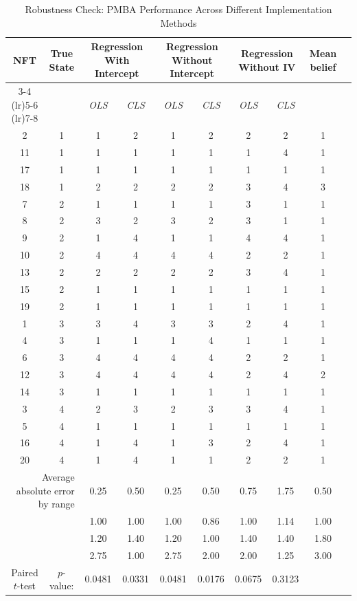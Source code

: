 \documentclass[12pt,reqno]{amsart}
\begin{document}
\begin{table}[htbp]
\footnotesize
\centering
\tiny
\begin{threeparttable}
\caption{Robustness Check: PMBA Performance Across Different Implementation Methods}\label{tab:rob1}
\setlength{\tabcolsep}{4pt}\begin{tabular}{cccccccccc}
\toprule
\textbf{NFT} & \textbf{True State} & \multicolumn{2}{c}{Regression With Intercept} & \multicolumn{2}{c}{Regression Without Intercept} & \multicolumn{2}{c}{Regression Without IV} & Mean belief \\
\cmidrule(lr){3-4} \cmidrule(lr){5-6} \cmidrule(lr){7-8}
& & \textit{OLS} & \textit{CLS} & \textit{OLS} & \textit{CLS} & \textit{OLS} & \textit{CLS} & \\
\midrule
2  & 1 & 1 & 2 & 1 & 2 & 2 & 2 & 1 \\
11 & 1 & 1 & 1 & 1 & 1 & 1 & 4 & 1 \\
17 & 1 & 1 & 1 & 1 & 1 & 1 & 1 & 1 \\
18 & 1 & 2 & 2 & 2 & 2 & 3 & 4 & 3 \\
7  & 2 & 1 & 1 & 1 & 1 & 3 & 1 & 1 \\
8  & 2 & 3 & 2 & 3 & 2 & 3 & 1 & 1 \\
9  & 2 & 1 & 4 & 1 & 1 & 4 & 4 & 1 \\
10 & 2 & 4 & 4 & 4 & 4 & 2 & 2 & 1 \\
13 & 2 & 2 & 2 & 2 & 2 & 3 & 4 & 1 \\
15 & 2 & 1 & 1 & 1 & 1 & 1 & 1 & 1 \\
19 & 2 & 1 & 1 & 1 & 1 & 1 & 1 & 1 \\
1  & 3 & 3 & 4 & 3 & 3 & 2 & 4 & 1 \\
4  & 3 & 1 & 1 & 1 & 4 & 1 & 1 & 1 \\
6  & 3 & 4 & 4 & 4 & 4 & 2 & 2 & 1 \\
12 & 3 & 4 & 4 & 4 & 4 & 2 & 4 & 2 \\
14 & 3 & 1 & 1 & 1 & 1 & 1 & 1 & 1 \\
3  & 4 & 2 & 3 & 2 & 3 & 3 & 4 & 1 \\
5  & 4 & 1 & 1 & 1 & 1 & 1 & 1 & 1 \\
16 & 4 & 1 & 4 & 1 & 3 & 2 & 4 & 1 \\
20 & 4 & 1 & 4 & 1 & 1 & 2 & 2 & 1 \\
\midrule
\multicolumn{2}{r}{Average absolute error by range} & 0.25 & 0.50 & 0.25 & 0.50 & 0.75 & 1.75 & 0.50 \\
& & 1.00 & 1.00 & 1.00 & 0.86 & 1.00 & 1.14 & 1.00 \\
& & 1.20 & 1.40 & 1.20 & 1.00 & 1.40 & 1.40 & 1.80 \\
& & 2.75 & 1.00 & 2.75 & 2.00 & 2.00 & 1.25 & 3.00 \\
\midrule
Paired $t$-test & $p$-value:  & 0.0481 & 0.0331 & 0.0481 & 0.0176 & 0.0675 & 0.3123 & \\
\bottomrule
\end{tabular}


\end{threeparttable}
\end{table}
\end{document}
